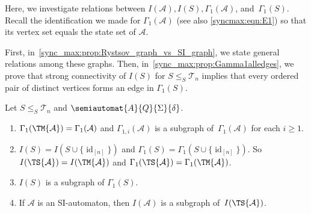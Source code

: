 
Here, we investigate relations between $I(\mathcal A), I(S), \Gamma_1(\mathcal A)$, and~$\Gamma_1(S)$.
Recall the identification we made for
$\Gamma_1(\mathcal A)$  (see also \cref{syncmax:eqn:E1})
so that its vertex set equals the state set of $\mathcal A$.

First, in~\cref{sync_max:prop:Rystsov_graph_vs_SI_graph}, we state general relations among these graphs.
Then, in~\cref{sync_max:prop:Gamma1alledges}, we prove that strong connectivity of $I(S)$ for $S \le_S\mathcal T_n$
implies that every ordered pair of distinct vertices forms an edge in $\Gamma_1(S)$.

\begin{proposition}
	\label{sync_max:prop:Rystsov_graph_vs_SI_graph}
	\label{sync_max:prop:IS_in_Gamma1}
	Let $S \le_S \mathcal T_n$ and $\semiautomat{A}{Q}{\Sigma}{\delta}$.
	
	\begin{enumerate}
		\item \label{sync_max:prop:item:GammaS_equal_GammaA} $\Gamma_1(\TM{\mathcal A}) = \Gamma_1(\mathcal A)$
		and $\Gamma_{1,i}(\mathcal A)$ is a subgraph of~$\Gamma_1(\mathcal A)$ for each $i \ge 1$.
		
		\item \label{sync_max:prop:item:IS_equal_IM} $I(S) = I(S \cup \{ \operatorname{id}_{[n]} \})$
		and 
		$\Gamma_1(S) = \Gamma_1(S \cup \{ \operatorname{id}_{[n]}\})$.
		So $I(\TS{\mathcal A}) = I(\TM{\mathcal A})$ and $\Gamma_1(\TS{\mathcal A}) = \Gamma_1(\TM{\mathcal A})$.	
		
		\item \label{sync_max:prop:item:ISsubgraphGamma1} $I(S)$ is a subgraph of $\Gamma_1(S)$.
		
		\item \label{sync_max:prop:item:IAsubgraphIS} If $\mathcal A$ is an SI-automaton, then 
		$I(\mathcal A)$ is a subgraph of~$I(\TS{\mathcal A})$.
	\end{enumerate}	
\end{proposition} 
